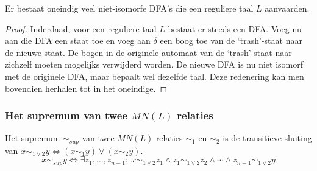 \documentclass[main.tex]{subfiles}
\begin{document}
\begin{st}
  \label{st:oneindig-veel-dfas-voor-een-taal}
  Er bestaat oneindig veel niet-isomorfe DFA's die een reguliere taal $L$ aanvaarden.

  \begin{proof}
    Inderdaad, voor een reguliere taal $L$ bestaat er steeds een DFA.
    Voeg nu aan die DFA een staat toe en voeg aan $\delta$ een boog toe van de `trash'-staat naar de nieuwe staat.
    De bogen in de originele automaat van de `trash'-staat naar zichzelf moeten mogelijks verwijderd worden.
    De nieuwe DFA is nu niet isomorf met de originele DFA, maar bepaalt wel dezelfde taal.
    Deze redenering kan men bovendien herhalen tot in het oneindige.
  \end{proof}
\end{st}

\subsubsection{Het supremum van twee $MN(L)$ relaties}
\label{sec:het-supremum-van}

\begin{de}
  Het supremum $\sim_{sup}$ van twee $MN(L)$ relaties $\sim_{1}$ en $\sim_{2}$ is de transitieve sluiting van $x \sim_{1 \vee 2} y \Leftrightarrow (x \sim_{1} y) \vee (x \sim_{2} y)$.
  \[ x\sim_{sup}y \Leftrightarrow \exists z_{1},\dotsc,z_{n-1}:\ x\sim_{1 \vee 2}z_{1} \wedge z_{1}\sim_{1 \vee 2}z_{2} \wedge \dotsb \wedge z_{n-1} \sim_{1 \vee 2} y \]
\end{de}
\end{document}

